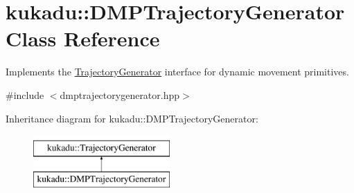 \hypertarget{classkukadu_1_1DMPTrajectoryGenerator}{\section{kukadu\-:\-:D\-M\-P\-Trajectory\-Generator Class Reference}
\label{classkukadu_1_1DMPTrajectoryGenerator}
}


Implements the \hyperlink{classkukadu_1_1TrajectoryGenerator}{Trajectory\-Generator} interface for dynamic movement primitives.  




{\ttfamily \#include $<$dmptrajectorygenerator.\-hpp$>$}

Inheritance diagram for kukadu\-:\-:D\-M\-P\-Trajectory\-Generator\-:\begin{figure}[H]
\begin{center}
\leavevmode
\includegraphics[height=2.000000cm]{classkukadu_1_1DMPTrajectoryGenerator}
\end{center}
\end{figure}

